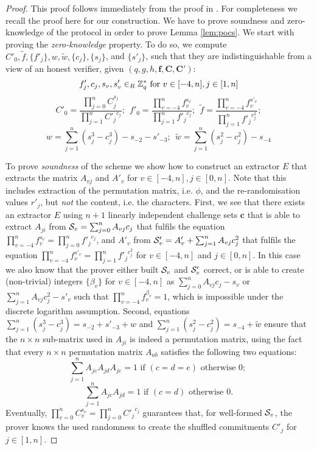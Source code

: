 \begin{proof}
This proof follows immediately from the proof in \cite{Furukawa05}.
For completeness we recall the proof here for our construction.
  We have to prove soundness and zero-knowledge of the \PoS protocol in order to prove Lemma \ref{lem:pocs}.
  We start with proving the \emph{zero-knowledge} property.
  To do so, we compute $C'_0, \tilde{f}, \{f'_j\}, w, \tilde{w}, \{c_j\}, \{s_j\}$, and $\{s'_j\}$, such that they are indistinguishable from a view of an honest verifier, given $(q,g,h,\bm f, \bm C, \bm C')$:
  \[
    f'_j, c_j, s_v, s'_v \in_R \mathbb{Z}^\ast_q \text{ for } v\in[-4,n], j\in[1,n]
  \]
  \[
    C'_0 = \frac{\prod_{j=0}^n C_j^{s_j}}{\prod_{j=1}^n {C'_j}^{c_j}};~~
    f'_0 = \frac{\prod_{v=-4}^n f_v^{s_v}}{\prod_{j=1}^n {f'_j}^{c_j}};~~
    \tilde{f} = \frac{\prod_{v=-4}^n f_v^{s'_v}}{\prod_{j=1}^n {f'_j}^{c^2_j}};
  \]
  \[
    w = \sum_{j=1}^n (s_j^3 - c_j^3) - s_{-2} - s'_{-3};~~
    \tilde{w} = \sum_{j=1}^n (s_j^2 - c_j^2) - s_{-4}
  \]

\noindent
To prove \emph{soundness} of the \PoS scheme we show how to construct an extractor $E$ that extracts the matrix $A_{vj}$ and $A'_v$ for $v\in[-4,n], j\in[0,n]$.
  Note that this includes extraction of the permutation matrix, i.e. $\phi$, and the re-randomisation values $r'_j$, but \emph{not} the content, i.e. the characters.
  First, we see that there exists an extractor $E$ using $n+1$ linearly independent challenge sets $\bm c$ that is able to extract $A_{ji}$ from $\mathcal{S}_v=\sum_{j=0}^n A_{vj}c_j$ that fulfils the equation $\prod_{v=-4}^n f_v^{s_v}=\prod_{j=0}^n {f'_j}^{c_j}$, and $A'_v$ from $\mathcal{S}'_v=A'_v + \sum_{j=1}^n A_{vj}c_j^2$ that fulfils the equation $\prod_{v=-4}^n f_v^{s'_v}=\prod_{j=1}^n {f'_j}^{c^2_j}$ for $v\in[-4,n]$ and $j\in[0,n]$.
  In this case we also know that the prover either built $\mathcal{S}_v$ and $\mathcal{S}'_v$ correct, or is able to create (non-trivial) integers $\{\beta_v\}$ for $v\in[-4,n]$ as $\sum_{j=0}^n A_{vj}c_j - s_v$ or $\sum_{j=1}^n A_{vj}c^2_j - s'_v$ such that $\prod_{v=-4}^n f_v^{\beta_v} = 1$, which is impossible under the discrete logarithm assumption.
  Second, equations $\sum_{j=1}^n (s_j^3 - c_j^3)=s_{-2} + s'_{-3} + w$ and $\sum_{j=1}^n (s_j^2 - c_j^2)= s_{-4} + \tilde{w}$ ensure that the $n\times n$ sub-matrix used in $A_{ji}$ is indeed a permutation matrix, using the fact that every $n\times n$ permutation matrix $A_{ab}$ satisfies the following two equations:
  \[
    \sum_{j=1}^n A_{jc} A_{jd} A_{je} = 1 \text{ if } (c=d=e) \text{ otherwise } 0; ~
  \]
  \[
    \sum_{j=1}^n A_{jc} A_{jd} = 1 \text{ if } (c=d) \text{ otherwise } 0.
  \]
  Eventually, $\prod_{v=0}^n C_v^{s_v}=\prod_{j=0}^n {C'_j}^{c_j}$ guarantees that, for well-formed $\mathcal{S}_v$, the prover knows the used randomness to create the shuffled commitments $C'_j$ for $j\in[1,n]$.
\end{proof}

